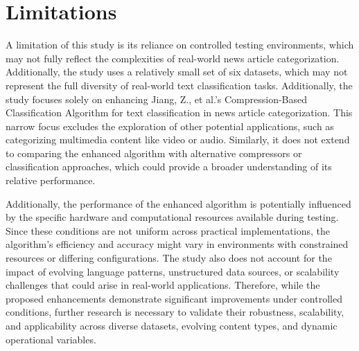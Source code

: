 \documentclass{article}
\begin{document}
\section{Limitations}

A limitation of this study is its reliance on controlled testing environments, which may not fully reflect the complexities of real-world news article categorization. Additionally, the study uses a relatively small set of six datasets, which may not represent the full diversity of real-world text classification tasks. Additionally, the study focuses solely on enhancing Jiang, Z., et al.'s Compression-Based Classification Algorithm for text classification in news article categorization. This narrow focus excludes the exploration of other potential applications, such as categorizing multimedia content like video or audio. Similarly, it does not extend to comparing the enhanced algorithm with alternative compressors or classification approaches, which could provide a broader understanding of its relative performance.

Additionally, the performance of the enhanced algorithm is potentially influenced by the specific hardware and computational resources available during testing. Since these conditions are not uniform across practical implementations, the algorithm's efficiency and accuracy might vary in environments with constrained resources or differing configurations. The study also does not account for the impact of evolving language patterns, unstructured data sources, or scalability challenges that could arise in real-world applications. Therefore, while the proposed enhancements demonstrate significant improvements under controlled conditions, further research is necessary to validate their robustness, scalability, and applicability across diverse datasets, evolving content types, and dynamic operational variables.



\end{document}

